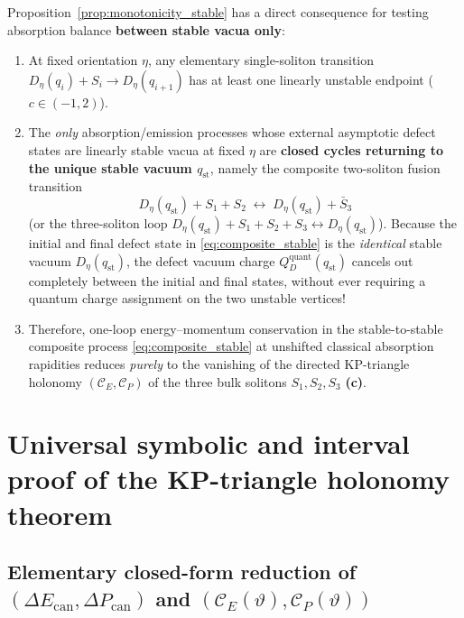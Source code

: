 \documentclass[11pt,a4paper]{article}
\theoremstyle{remark}
\newcommand{\Lc}{\textbf{(c)}}
\begin{document}
Proposition~\ref{prop:monotonicity_stable} has a direct consequence for testing
absorption balance \textbf{between stable vacua only}:
\begin{enumerate}
\item At fixed orientation $\eta$, any elementary single-soliton transition
$D_\eta(q_i) + S_i \to D_\eta(q_{i+1})$ has at least one linearly unstable
endpoint ($c \in (-1,2)$).
\item The \emph{only} absorption/emission processes whose external asymptotic
defect states are linearly stable vacua at fixed $\eta$ are \textbf{closed
cycles returning to the unique stable vacuum $q_{\mathrm{st}}$}, namely the
composite two-soliton fusion transition
\begin{equation}\label{eq:composite_stable}
  D_\eta(q_{\mathrm{st}}) + S_1 + S_2 \;\longleftrightarrow\; D_\eta(q_{\mathrm{st}}) + \bar{S}_3
\end{equation}
(or the three-soliton loop $D_\eta(q_{\mathrm{st}}) + S_1 + S_2 + S_3 \leftrightarrow D_\eta(q_{\mathrm{st}})$).
Because the initial and final defect state in \eqref{eq:composite_stable} is
the \emph{identical} stable vacuum $D_\eta(q_{\mathrm{st}})$, the defect vacuum
charge $Q_D^{\mathrm{quant}}(q_{\mathrm{st}})$ cancels out completely between
the initial and final states, without ever requiring a quantum charge
assignment on the two unstable vertices!
\item Therefore, one-loop energy--momentum conservation in the stable-to-stable
composite process \eqref{eq:composite_stable} at unshifted classical absorption
rapidities reduces \emph{purely} to the vanishing of the directed KP-triangle
holonomy $(\mathcal{C}_E,\mathcal{C}_P)$ of the three bulk solitons
$S_1,S_2,S_3$ \Lc.
\end{enumerate}

\section{Universal symbolic and interval proof of the KP-triangle holonomy theorem}
\label{sec:holonomy}

\subsection{Elementary closed-form reduction of \texorpdfstring{$(\Delta E_{\mathrm{can}},\Delta P_{\mathrm{can}})$}{(Delta E\_can, Delta P\_can)} and \texorpdfstring{$(\mathcal{C}_E(\vartheta),\mathcal{C}_P(\vartheta))$}{(C\_E(theta), C\_P(theta))}}
\end{document}
